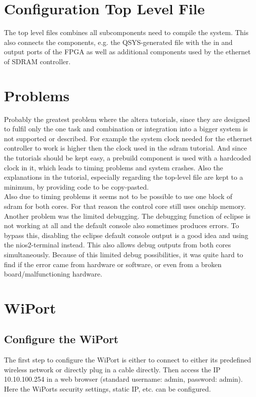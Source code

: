 \section{Configuration Top Level File}
The top level files combines all subcomponents need to compile the system. This also connects the components, e.g. the QSYS-generated file with the in and output ports of the FPGA as well as additional components used by the ethernet of SDRAM controller. 

\section{Problems}
Probably the greatest problem where the altera tutorials, since they are designed to fulfil only the one task and combination or integration into a bigger system is not supported or described. For example the system clock needed for the ethernet controller to work is higher then the clock used in the sdram tutorial. And since the tutorials should be kept easy, a prebuild component is used with a hardcoded clock in it, which leads to timing problems and system crashes. Also the explanations in the tutorial, especially regarding the top-level file are kept to a minimum, by providing code to be copy-pasted.\\
Also due to timing problems it seems not to be possible to use one block of sdram for both cores. For that reason the control core still uses onchip memory.\\
Another problem was the limited debugging. The debugging function of eclipse is not working at all and the default console also sometimes produces errors. To bypass this, disabling the eclipse default console output is a good idea and using the nios2-terminal instead. This also allows debug outputs from both cores simultaneously. Because of this limited debug possibilities, it was quite hard to find if the error came from hardware or software, or even from a broken board/malfunctioning hardware.

\section{WiPort}

\subsection{Configure the WiPort}

The first step to configure the WiPort is either to connect to either its predefined wireless network or directly plug 
in a cable directly. Then access the IP 10.10.100.254 in a web browser (standard username: admin, password: admin).
Here the WiPorts security settings, static IP, etc. can be configured.

